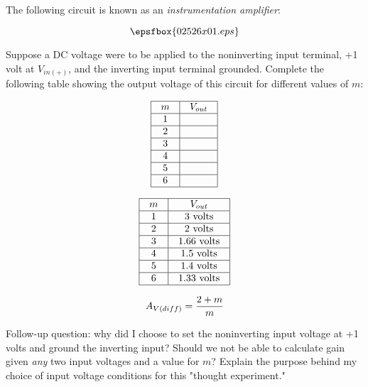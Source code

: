 

The following circuit is known as an {\it instrumentation amplifier}:

$$\epsfbox{02526x01.eps}$$

Suppose a DC voltage were to be applied to the noninverting input terminal, +1 volt at $V_{in(+)}$, and the inverting input terminal grounded.  Complete the following table showing the output voltage of this circuit for different values of $m$:


$$\vbox{\offinterlineskip
\halign{\strut
\vrule \quad\hfil # \ \hfil & 
\vrule \quad\hfil # \ \hfil \vrule \cr
\noalign{\hrule}
%
$m$ & $V_{out}$ \cr
%
\noalign{\hrule}
%
1 &  \cr
%
\noalign{\hrule}
%
2 &  \cr
%
\noalign{\hrule}
%
3 &  \cr
%
\noalign{\hrule}
%
4 &  \cr
%
\noalign{\hrule}
%
5 &  \cr
%
\noalign{\hrule}
%
6 &  \cr
%
\noalign{\hrule}
} %
}$$ %








$$\vbox{\offinterlineskip
\halign{\strut
\vrule \quad\hfil # \ \hfil & 
\vrule \quad\hfil # \ \hfil \vrule \cr
\noalign{\hrule}
%
$m$ & $V_{out}$ \cr
%
\noalign{\hrule}
%
1 & 3 volts \cr
%
\noalign{\hrule}
%
2 & 2 volts \cr
%
\noalign{\hrule}
%
3 & 1.66 volts \cr
%
\noalign{\hrule}
%
4 & 1.5 volts \cr
%
\noalign{\hrule}
%
5 & 1.4 volts \cr
%
\noalign{\hrule}
%
6 & 1.33 volts \cr
%
\noalign{\hrule}
} %
}$$ %

$$A_{V(diff)} = {{2 + m} \over m}$$

\vskip 10pt

Follow-up question: why did I choose to set the noninverting input voltage at +1 volts and ground the inverting input?  Should we not be able to calculate gain given {\it any} two input voltages and a value for $m$?  Explain the purpose behind my choice of input voltage conditions for this "thought experiment."

